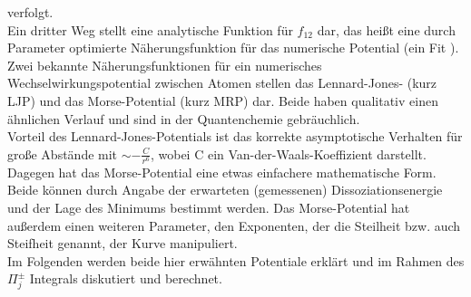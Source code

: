 verfolgt.\\
Ein dritter Weg stellt eine analytische Funktion für $f_{12}$ dar, das heißt 
eine durch Parameter optimierte Näherungsfunktion für das numerische Potential 
(ein Fit ). Zwei bekannte Näherungsfunktionen für ein numerisches 
Wechselwirkungspotential zwischen Atomen stellen das 
Lennard-Jones- (kurz LJP) 
und das Morse-Potential (kurz MRP) dar. Beide haben qualitativ
einen ähnlichen Verlauf und sind in der Quantenchemie gebräuchlich.\\
Vorteil des Lennard-Jones-Potentials ist das korrekte asymptotische Verhalten 
für große Abstände mit $\sim -\frac{C}{r^6}$, wobei C ein 
Van-der-Waals-Koeffizient darstellt. Dagegen hat das Morse-Potential eine etwas 
einfachere mathematische Form. Beide können durch Angabe der erwarteten 
(gemessenen) Dissoziationsenergie und der Lage des Minimums 
bestimmt 
werden. Das Morse-Potential hat außerdem einen weiteren 
Parameter, den 
Exponenten, der die Steilheit bzw. auch Steifheit genannt, 
der Kurve 
manipuliert.\\

Im Folgenden werden beide hier erwähnten Potentiale erklärt und im Rahmen des 
$\Pi^\pm_j$ Integrals diskutiert und berechnet.
%
%
%
